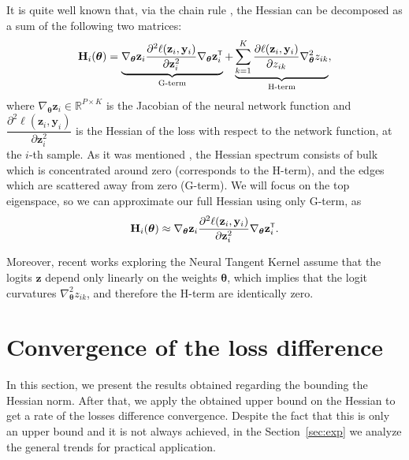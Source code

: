\documentclass{article}
\begin{document}
It is quite well known \cite{sagun2018empiricalanalysishessianoverparametrized} that, via the chain rule \cite{skorski2019chainruleshessianhigher}, the Hessian can be decomposed as a sum of the following two matrices: 
\[
    \mathbf{H}_{i}(\boldsymbol{\theta}) = \underbrace{\nabla_{\boldsymbol{\theta}} \mathbf{z}_i \dfrac{\partial^2 \ell(\mathbf{z}_i, \mathbf{y}_i)}{\partial \mathbf{z}_{i}^2} \nabla_{\boldsymbol{\theta}} \mathbf{z}_i\T }_{\text{G-term}} + \underbrace{\sum\limits_{k=1}^{K} \dfrac{\partial \ell(\mathbf{z}_i, \mathbf{y}_i)}{\partial z_{ik}} \nabla^2_{\boldsymbol{\theta}} z_{ik}}_{\text{H-term}},
\]
where $\nabla_{\boldsymbol{\theta}} \mathbf{z}_i \in \mathbb{R}^{P \times K}$ is the Jacobian of the neural network function and $\dfrac{\partial^2 \ell(\mathbf{z}_i, \mathbf{y}_i)}{\partial \mathbf{z}_{i}^2}$ is the Hessian of the loss with respect to the network function, at the $i$-th sample. As it was mentioned \cite{pmlr-v97-ghorbani19b,sagun2018empiricalanalysishessianoverparametrized,papyan2019spectrumdeepnethessiansscale}, the Hessian spectrum consists of  bulk which is concentrated around zero (corresponds to the H-term), and the edges which are scattered away from zero (G-term). We will focus on the top eigenspace, so we can approximate our full Hessian using only G-term, as
\[ \mathbf{H}_{i}(\boldsymbol{\theta}) \approx \nabla_{\boldsymbol{\theta}} \mathbf{z}_i \dfrac{\partial^2 \ell(\mathbf{z}_i, \mathbf{y}_i)}{\partial \mathbf{z}_{i}^2} \nabla_{\boldsymbol{\theta}} \mathbf{z}_i\T. \]

Moreover, recent works exploring the Neural Tangent Kernel \cite{NEURIPS2018_5a4be1fa,Lee_2020} assume that the logits $\mathbf{z}$ depend only linearly on the weights $\boldsymbol{\theta}$, which implies that the logit curvatures $\nabla^2_{\boldsymbol{\theta}} z_{ik}$, and therefore the H-term are identically zero. 

\section{Convergence of the loss difference}\label{sec:converg}

In this section, we present the results obtained regarding the bounding the Hessian norm. After that, we apply the obtained upper bound on the Hessian to get a rate of the losses difference convergence. Despite the fact that this is only an upper bound and it is not always achieved, in the Section~\ref{sec:exp} we analyze the general trends for practical application. 
\end{document}
